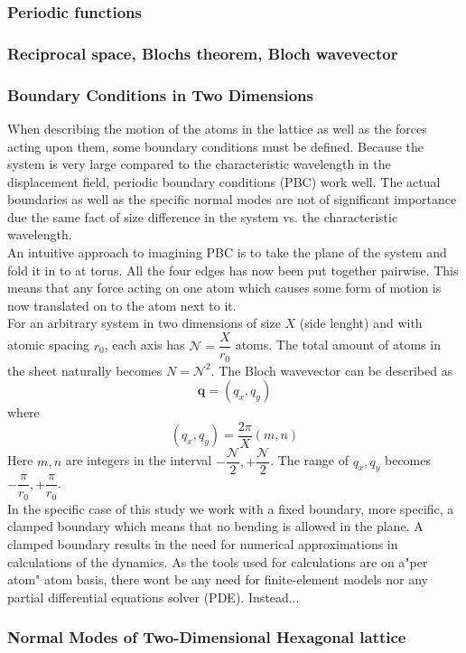 \subsubsection{Periodic functions}
\subsubsection{Reciprocal space, Blochs theorem, Bloch wavevector}

\subsubsection{Boundary Conditions in Two Dimensions}

When describing the motion of the atoms in the lattice as well as the forces acting upon them, some boundary conditions must be defined. Because the system is very large compared to the characteristic wavelength in the displacement field, periodic boundary conditions (PBC) work well. The actual boundaries as well as the specific normal modes are not of significant importance due the same fact of size difference in the system vs. the characteristic wavelength. \\
An intuitive approach to imagining PBC is to take the plane of the system and fold it in to at torus. All the four edges has now been put together pairwise. This means that any force acting on one atom which causes some form of motion is now translated on to the atom next to it.\\
For an arbitrary system in two dimensions of size $X$ (side lenght) and with atomic spacing $r_{0}$, each axis has $\mathcal{N}=\dfrac{X}{r_{0}}$ atoms. The total amount of atoms in the sheet naturally becomes $N=\mathcal{N}^{2}$. The Bloch wavevector can be described as
\begin{equation}
     \mathbf{q}=(q_{x},q_{y})
\end{equation}
where
\begin{equation}
     (q_{x},q_{y})=\dfrac{2\pi}{X}(m,n)
\end{equation}
Here $m,n$ are integers in the interval $-\dfrac{\mathcal{N}}{2}, +\dfrac{\mathcal{N}}{2}$. The range of $q_{x},q_{y}$ becomes $-\dfrac{\pi}{r_{0}},+\dfrac{\pi}{r_{0}}$.\\
In the specific case of this study we work with a fixed boundary, more specific, a clamped boundary which means that no bending is allowed in the plane. A clamped boundary results in the need for numerical approximations in calculations of the dynamics. As the tools used for calculations are on a"per atom" atom basis, there wont be any need for finite-element models nor any partial differential equations solver (PDE). Instead...

\subsubsection{Normal Modes of Two-Dimensional Hexagonal lattice}
 
